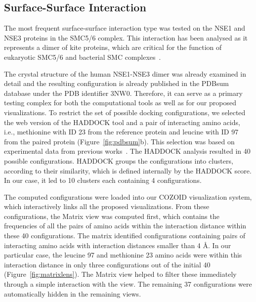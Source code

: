 \documentclass{bmcart}
\def\MatView {Matrix view\xspace}
\begin{document}
\subsection*{Surface-Surface Interaction}
The most frequent surface-surface interaction type was tested on the NSE1 and NSE3 proteins in the SMC5/6 complex. 
This interaction has been analysed as it represents a dimer of kite proteins, which are critical for the function of eukaryotic SMC5/6 and bacterial SMC complexes~\cite{Zabrady2016,Palecek2015,Doyle2010}. 

The crystal structure of the human NSE1-NSE3 dimer was already examined in detail and the resulting configuration is already published in the PDBsum database under the PDB identifier 3NW0. 
Therefore, it can serve as a primary testing complex for both the computational tools as well as for our proposed visualizations.
To restrict the set of possible docking configurations, we selected the web version of the HADDOCK tool and a pair of interacting amino acids, i.e., methionine with ID 23 from the reference protein and leucine with ID 97 from the paired protein (Figure~\ref{fig:pdbsum}b).
This selection was based on experimental data from previous works~\cite{Doyle2010,Hudson2011,Kozakova,Crabben}.
The HADDOCK analysis resulted in 40 possible configurations.
HADDOCK groups the configurations into clusters, according to their similarity, which is defined internally by the HADDOCK score.
In our case, it led to 10 clusters each containing 4 configurations.

The computed configurations were loaded into our COZOID visualization system, which interactively links all the proposed visualizations.
From these configurations, the \MatView was computed first, which contains the frequencies of all the pairs of amino acids within the interaction distance within these 40 configurations.
The matrix identified configurations containing pairs of interacting amino acids with interaction distances smaller than 4 \AA.
In our particular case, the leucine 97 and methionine 23 amino acids were within this interaction distance in only three configurations out of the initial 40 (Figure~\ref{fig:matrixlens}). 
The Matrix view helped to filter these immediately through a simple interaction with the view. 
The remaining 37 configurations were automatically hidden in the remaining views.
\end{document}
